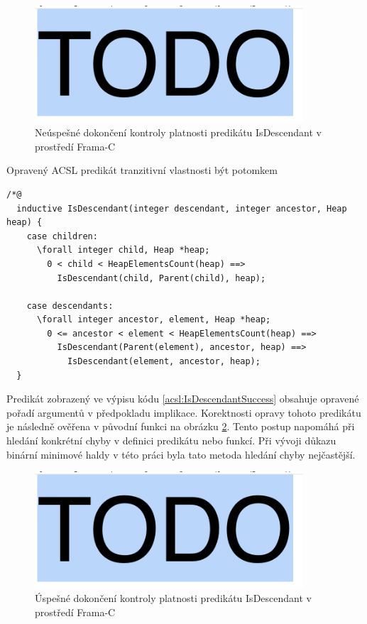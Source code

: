 \begin{figure}[H]
	\centering
	\includegraphics[width=10cm]{images/frama-c-test-IsDescendantFail}
	\caption{Neúspešné dokončení kontroly platnosti predikátu  IsDescendant v prostředí Frama-C}
	\label{img:F-C-test-IsDescendantFail}
\end{figure}


\begin{listing}[H]
	\caption{Opravený ACSL predikát tranzitivní vlastnosti být potomkem}
	\label{acsl:IsDescendantSuccess}
	\begin{verbatim}
/*@
  inductive IsDescendant(integer descendant, integer ancestor, Heap heap) {
    case children:
      \forall integer child, Heap *heap;
        0 < child < HeapElementsCount(heap) ==>
          IsDescendant(child, Parent(child), heap);

    case descendants:
      \forall integer ancestor, element, Heap *heap;
        0 <= ancestor < element < HeapElementsCount(heap) ==>
          IsDescendant(Parent(element), ancestor, heap) ==> 
            IsDescendant(element, ancestor, heap);
  }
    \end{verbatim}
\end{listing}

Predikát zobrazený ve výpisu kódu \ref{acsl:IsDescendantSuccess} obsahuje opravené pořadí argumentů v předpokladu implikace. Korektnosti opravy tohoto predikátu je následně ověřena v původní funkci na obrázku \ref{img:F-C-test-IsDescendantSuccess}. Tento postup napomáhá při hledání konkrétní chyby v definici predikátu nebo funkcí. Při vývoji důkazu binární minimové haldy v této práci byla tato metoda hledání chyby nejčastější.

\begin{figure}[H]
	\centering
	\includegraphics[width=10cm]{images/frama-c-test-IsDescendantSuccess}
	\caption{Úspešné dokončení kontroly platnosti predikátu  IsDescendant v prostředí Frama-C}
	\label{img:F-C-test-IsDescendantSuccess}
\end{figure}


